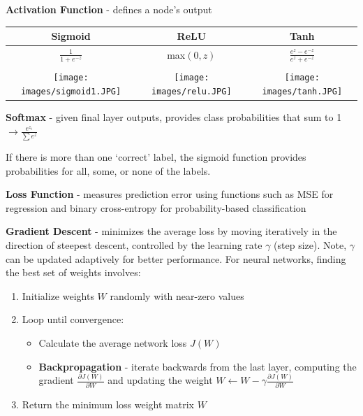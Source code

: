\documentclass[10pt,landscape]{article}
\begin{document}
\begin{multicols}{3}
\textbf{Activation Function} - defines a node's output

\vspace{-1mm}
\begin{center}
\begin{tabular}{c|c|c}
          Sigmoid & ReLU & Tanh\\
         \hline
         \rule{0pt}{3ex}
         $\frac{1}{1+e^{-z}} $  & max$(0,z)$ & $\frac{e^z - e^{-z}}{e^z + e^{-z}}$\\
           &   &  \vspace{-2mm}\\

         \hline
         \texttt{[image: images/sigmoid1.JPG]} &
         \texttt{[image: images/relu.JPG]} &
         \texttt{[image: images/tanh.JPG]}

\end{tabular}
\end{center}
\textbf{Softmax} - given final layer outputs, provides class probabilities that sum to 1 $\to \frac{e^{z_i}}{\sum e^{z}}$

If there is more than one `correct' label, the sigmoid function provides probabilities for all, some, or none of the labels.


\smallskip
\textbf{Loss Function} - measures prediction error using functions such as MSE for regression and binary cross-entropy for probability-based classification

\smallskip
\textbf{Gradient Descent} - minimizes the average loss by moving iteratively in the direction of steepest descent, controlled by the learning rate $\gamma$ (step size). Note, $\gamma$ can be updated adaptively for better performance. For neural networks, finding the best set of weights involves:
\begin{enumerate}[leftmargin=5mm]
\itemsep -.4mm
\item Initialize weights $W$ randomly with near-zero values
\item Loop until convergence:
    \begin{itemize}[label={--},leftmargin=4mm]
    \itemsep -.4mm
    \item Calculate the average network loss $J(W)$
    \item \textbf{Backpropagation} - iterate backwards from the last layer, computing the gradient $\frac{\partial J(W)}{\partial W}$ and updating the weight $W \leftarrow W - \gamma \frac{\partial J(W)}{\partial W}$
    \end{itemize}
\item Return the minimum loss weight matrix $W$
\end{enumerate}


\end{multicols}
\end{document}
